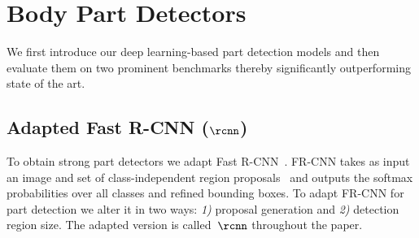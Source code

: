 \section{Body Part Detectors}
\label{section:unary}
\setlength{\belowdisplayskip}{1pt} \setlength{\belowdisplayshortskip}{1pt}
\setlength{\abovedisplayskip}{1pt} \setlength{\abovedisplayshortskip}{1pt}


We first introduce our deep learning-based part detection models and
then evaluate them on two prominent benchmarks thereby significantly
outperforming state of the art.

\subsection{Adapted Fast R-CNN ($\rcnn$)}
\label{sec:R-CNN-for-pose-estimation}
To obtain strong part detectors we adapt Fast
R-CNN~\cite{girshickICCV15fastrcnn}.
FR-CNN takes as input an image and set of class-independent region
proposals~\cite{Uijlings13}
and outputs the softmax probabilities over all classes and refined
bounding boxes. To adapt FR-CNN for part detection we alter it in two
ways: {\it 1)} proposal generation and {\it 2)} detection region
size. The adapted version is called~$\rcnn$ throughout the paper.


